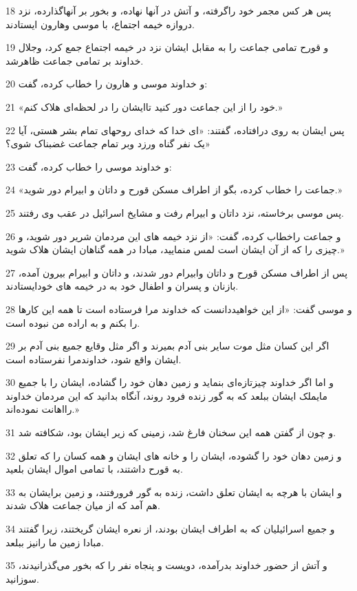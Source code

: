 \par 18 پس هر کس مجمر خود راگرفته، و آتش در آنها نهاده، و بخور بر آنهاگذارده، نزد دروازه خیمه اجتماع، با موسی وهارون ایستادند.
\par 19 و قورح تمامی جماعت را به مقابل ایشان نزد در خیمه اجتماع جمع کرد، وجلال خداوند بر تمامی جماعت ظاهرشد.
\par 20 و خداوند موسی و هارون را خطاب کرده، گفت:
\par 21 «خود را از این جماعت دور کنید تاایشان را در لحظه‌ای هلاک کنم.»
\par 22 پس ایشان به روی در‌افتاده، گفتند: «ای خدا که خدای روحهای تمام بشر هستی، آیا یک نفر گناه ورزد وبر تمام جماعت غضبناک شوی؟»
\par 23 و خداوند موسی را خطاب کرده، گفت:
\par 24 «جماعت را خطاب کرده، بگو از اطراف مسکن قورح و داتان و ابیرام دور شوید.»
\par 25 پس موسی برخاسته، نزد داتان و ابیرام رفت و مشایخ اسرائیل در عقب وی رفتند.
\par 26 و جماعت راخطاب کرده، گفت: «از نزد خیمه های این مردمان شریر دور شوید، و چیزی را که از آن ایشان است لمس منمایید، مبادا در همه گناهان ایشان هلاک شوید.»
\par 27 پس از اطراف مسکن قورح و داتان وابیرام دور شدند، و داتان و ابیرام بیرون آمده، بازنان و پسران و اطفال خود به در خیمه های خودایستادند.
\par 28 و موسی گفت: «از این خواهیددانست که خداوند مرا فرستاده است تا همه این کارها را بکنم و به اراده من نبوده است.
\par 29 اگر این کسان مثل موت سایر بنی آدم بمیرند و اگر مثل وقایع جمیع بنی آدم بر ایشان واقع شود، خداوندمرا نفرستاده است.
\par 30 و اما اگر خداوند چیزتازه‌ای بنماید و زمین دهان خود را گشاده، ایشان را با جمیع مایملک ایشان ببلعد که به گور زنده فرود روند، آنگاه بدانید که این مردمان خداوند رااهانت نموده‌اند.»
\par 31 و چون از گفتن همه این سخنان فارغ شد، زمینی که زیر ایشان بود، شکافته شد.
\par 32 و زمین دهان خود را گشوده، ایشان را و خانه های ایشان و همه کسان را که تعلق به قورح داشتند، با تمامی اموال ایشان بلعید.
\par 33 و ایشان با هرچه به ایشان تعلق داشت، زنده به گور فرورفتند، و زمین برایشان به هم آمد که از میان جماعت هلاک شدند.
\par 34 و جمیع اسرائیلیان که به اطراف ایشان بودند، از نعره ایشان گریختند، زیرا گفتند مبادا زمین ما رانیز ببلعد.
\par 35 و آتش از حضور خداوند بدر‌آمده، دویست و پنجاه نفر را که بخور می‌گذرانیدند، سوزانید.
